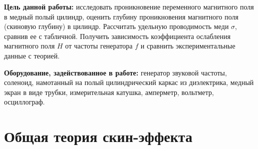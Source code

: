 


    

	\textbf{Цель данной работы:} исследовать проникновение переменного магнитного поля в медный полый цилиндр, оценить глубину проникновения магнитного поля (скиновую глубину) в цилиндр. Рассчитать удельную проводимость меди $\sigma$, сравнив ее с табличной. Получить зависимость коэффициента ослабления магнитного поля $H$ от частоты генератора $f$ и сравнить экспериментальные данные с теорией. 

	\vspace{10mm}
	\textbf{Оборудование, задействованное в работе:} генератор звуковой частоты, соленоид, намотанный на полый цилиндрический каркас из диэлектрика, медный экран в виде трубки, измерительная катушка, амперметр, вольтметр, осциллограф.

	\vspace{20mm}

	\section*{Общая теория скин-эффекта}
	
